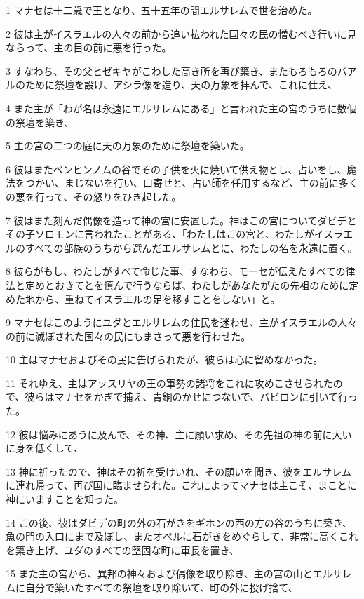 \par 1 マナセは十二歳で王となり、五十五年の間エルサレムで世を治めた。
\par 2 彼は主がイスラエルの人々の前から追い払われた国々の民の憎むべき行いに見ならって、主の目の前に悪を行った。
\par 3 すなわち、その父ヒゼキヤがこわした高き所を再び築き、またもろもろのバアルのために祭壇を設け、アシラ像を造り、天の万象を拝んで、これに仕え、
\par 4 また主が「わが名は永遠にエルサレムにある」と言われた主の宮のうちに数個の祭壇を築き、
\par 5 主の宮の二つの庭に天の万象のために祭壇を築いた。
\par 6 彼はまたベンヒンノムの谷でその子供を火に焼いて供え物とし、占いをし、魔法をつかい、まじないを行い、口寄せと、占い師を任用するなど、主の前に多くの悪を行って、その怒りをひき起した。
\par 7 彼はまた刻んだ偶像を造って神の宮に安置した。神はこの宮についてダビデとその子ソロモンに言われたことがある、「わたしはこの宮と、わたしがイスラエルのすべての部族のうちから選んだエルサレムとに、わたしの名を永遠に置く。
\par 8 彼らがもし、わたしがすべて命じた事、すなわち、モーセが伝えたすべての律法と定めとおきてとを慎んで行うならば、わたしがあなたがたの先祖のために定めた地から、重ねてイスラエルの足を移すことをしない」と。
\par 9 マナセはこのようにユダとエルサレムの住民を迷わせ、主がイスラエルの人々の前に滅ぼされた国々の民にもまさって悪を行わせた。
\par 10 主はマナセおよびその民に告げられたが、彼らは心に留めなかった。
\par 11 それゆえ、主はアッスリヤの王の軍勢の諸将をこれに攻めこさせられたので、彼らはマナセをかぎで捕え、青銅のかせにつないで、バビロンに引いて行った。
\par 12 彼は悩みにあうに及んで、その神、主に願い求め、その先祖の神の前に大いに身を低くして、
\par 13 神に祈ったので、神はその祈を受けいれ、その願いを聞き、彼をエルサレムに連れ帰って、再び国に臨ませられた。これによってマナセは主こそ、まことに神にいますことを知った。
\par 14 この後、彼はダビデの町の外の石がきをギホンの西の方の谷のうちに築き、魚の門の入口にまで及ぼし、またオペルに石がきをめぐらして、非常に高くこれを築き上げ、ユダのすべての堅固な町に軍長を置き、
\par 15 また主の宮から、異邦の神々および偶像を取り除き、主の宮の山とエルサレムに自分で築いたすべての祭壇を取り除いて、町の外に投げ捨て、
